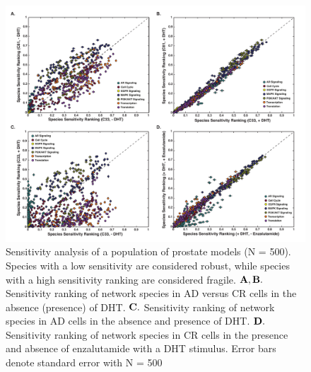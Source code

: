 \documentclass[12pt]{article}
\begin{document}
\clearpage

\begin{figure}\centering
\includegraphics[width=1.0\textwidth]{./figs/Fig_5_Sensitivity.pdf}
\caption{Sensitivity analysis of a population of prostate models (N = 500). Species with a low sensitivity are considered robust, while species with a high sensitivity ranking are considered fragile. $\bf{A,B.}$ Sensitivity ranking of network species in AD versus CR cells in the absence (presence) of DHT. $\bf{C.}$ Sensitivity ranking of network species in AD cells in the absence and presence of DHT. $\bf{D.}$ Sensitivity ranking of network species in CR cells in the presence and absence of enzalutamide with a DHT stimulus. Error bars denote standard error with N = 500}
\label{fg:Sensitivity}
\end{figure}

\clearpage
\end{document}
